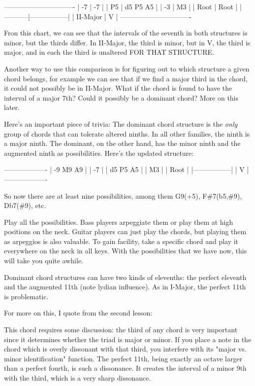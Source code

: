 -------------------------------
|    -7     |       -7        |
|    P5     |  d5   P5   A5   |
|    -3     |       M3        |
|   Root    |      Root       |
|-----------|-----------------|
| II-Major  |        V        |
-------------------------------

Fron this chart, we can see that the intervals of the seventh in both
structures is minor, but the thirds differ. In II-Major, the third is
minor, but in V, the third is major, and in each the third is unaltered
FOR THAT STRUCTURE.

Another way to use this comparison is for figuring out to which structure
a given chord belongs, for example we can see that if we find a major
third in the chord, it could not possibly be in II-Major. What if the
chord is found to have the interval of a major 7th? Could it possibly
be a dominant chord? More on this later.

Here's an important piece of trivia: The dominant chord structure is the
\emph{only} group of chords that can tolerate altered ninths. In all other
families, the ninth is a major ninth. The dominant, on the other hand,
has the minor ninth and the augmented ninth as possibilities. Here's the
updated structure:

-------------------
| -9    M9   A9   |
|       -7        |
|  d5   P5   A5   |
|       M3        |
|      Root       |
|-----------------|
|        V        |
-------------------

So now there are at least nine possibilities, among them G9(+5), F\#7(b5,\#9),
Db7(\#9), etc.

Play all the possibilities. Bass players arpeggiate them or play them at high
positions on the neck. Guitar players can just play the chords, but playing
them as arpeggios is also valuable. To gain facility, take a specific chord
and play it everywhere on the neck in all keys. With the possibilities that
we have now, this will take you quite awhile.

Dominant chord structures can have two kinds of elevenths: the perfect
eleventh and the augmented 11th (note lydian influence). As in I-Major,
the perfect 11th is problematic.

For more on this, I quote from the second lesson:

This chord requires some discussion: the third of any chord is very
important since it determines whether the triad is major or minor.
If you place a note in the chord which is overly dissonant with that
third, you interfere with its "major vs. minor identification" function.
The perfect 11th, being exactly an octave larger than a perfect fourth,
is such a dissonance. It creates the interval of a minor 9th with the
third, which is a very sharp dissonance.

